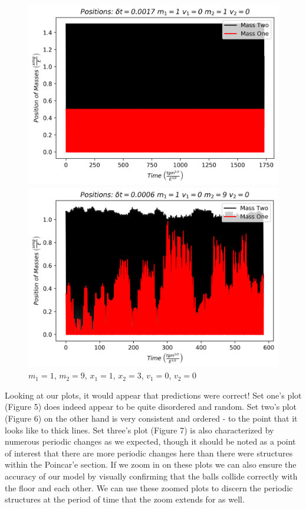 \documentclass[twocolumn]{article}
\begin{document}
\begin{figure}[H]
\caption{$m_1=1$, $m_2=1$, $x_1=1$, $x_2=3$, $v_1=0$, $v_2=0$}
\centering
\includegraphics[scale=.45]{Positions-MassOne1MassTwo1x1i1x2i3}
\caption{$m_1=1$, $m_2=9$, $x_1=1$, $x_2=3$, $v_1=0$, $v_2=0$}
\centering
\includegraphics[scale=.45]{Positions-MassOne1MassTwo9x1i1x2i3}
\end{figure}
Looking at our plots, it would appear that predictions were correct! Set one's plot (Figure 5) does indeed appear to be quite disordered and random. Set two's plot (Figure 6) on the other hand is very consistent and ordered - to the point that it looks like to thick lines. Set three's plot (Figure 7) is also characterized by numerous periodic changes as we expected, though it should be noted as a point of interest that there are more periodic changes here than there were structures within the Poincar'e section. If we zoom in on these plots we can also ensure the accuracy of our model by visually confirming that the balls collide correctly with the floor and each other. We can use these zoomed plots to discern the periodic structures at the period of time that the zoom extends for as well. \\
\end{document}
